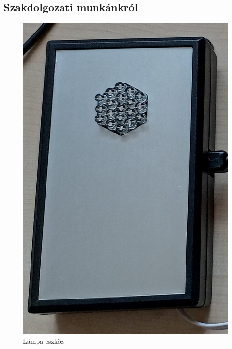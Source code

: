 \documentclass[tocnopagenum]{thesis-ekf}
\theoremstyle{definition}
\theoremstyle{remark}
\begin{document}
	\subsection{Szakdolgozati munkánkról}
	\begin{figure}[h!]
		\centering
		\includegraphics[scale=0.1]{images/foto_lampa.jpg}
		\caption{Lámpa eszköz}
		\label{fig:foto_lampa}
	\end{figure}
\end{document}
